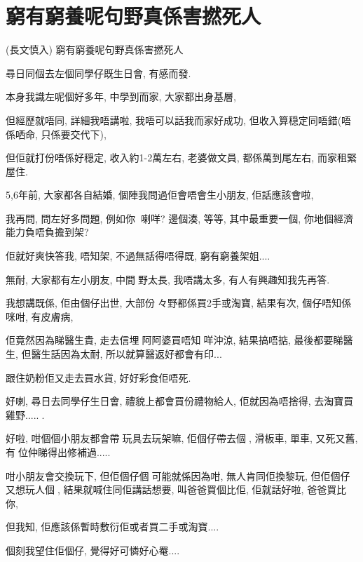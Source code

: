 \chapter{窮有窮養呢句野真係害撚死人}

(長文慎入) 窮有窮養呢句野真係害撚死人



尋日同個去左個同學仔既生日會, 有感而發.

本身我識左呢個好多年, 中學到而家, 大家都出身基層,

但經歷就唔同, 詳細我唔講啦, 我唔可以話我而家好成功, 但收入算穏定同唔錯(唔係哂命, 只係要交代下),

但佢就打份唔係好穏定, 收入約1-2萬左右, 老婆做文員, 都係萬到尾左右, 而家租緊屋住.

5,6年前, 大家都各自結婚, 個陣我問過佢會唔會生小朋友, 佢話應該會啦,

我再問, 問左好多問題, 例如你喇咩? 邊個湊, 等等, 其中最重要一個, 你地個經濟能力負唔負擔到架?

佢就好爽快答我, 唔知架, 不過無話得唔得既, 窮有窮養架姐....

無耐, 大家都有左小朋友, 中間野太長, 我唔講太多, 有人有興趣知我先再答.

我想講既係, 佢由個仔出世, 大部份々野都係買2手或淘寶, 結果有次, 個仔唔知係咪咁, 有皮膚病,

佢竟然因為睇醫生貴, 走去信埋阿阿婆買唔知咩沖涼, 結果搞唔掂, 最後都要睇醫生, 但醫生話因為太耐, 所以就算醫返好都會有印...

跟住奶粉佢又走去買水貨, 好好彩食佢唔死.

好喇, 尋日去同學仔生日會, 禮貌上都會買份禮物給人, 佢就因為唔捨得, 去淘寶買 雞野.....󰀙.

好啦, 咁個個小朋友都會帶玩具去玩架嘛, 佢個仔帶去個, 滑板車, 單車, 又死又舊, 有位仲睇得出修補過.....

咁小朋友會交換玩下, 但佢個仔個可能就係因為咁, 無人肯同佢換黎玩, 但佢個仔又想玩人個, 結果就喊住同佢講話想要, 叫爸爸買個比佢, 佢就話好啦, 爸爸買比你,

但我知, 佢應該係暫時敷衍佢或者買二手或淘寶....

個刻我望住佢個仔, 覺得好可憐好心罨....

